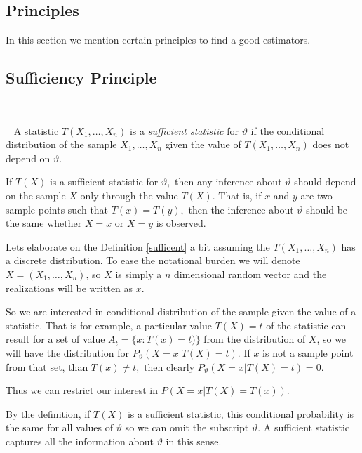 \documentclass[ 11pt,%
				a4paper,%
				twoside,%
				headinclude,%
				footinclude = true,%
				cleardoublepage = empty,%
				reqno]{scrbook}
\begin{document}
\subsection{Principles}


In this section we mention certain principles to find a good estimators. 

\subsection{Sufficiency Principle} %
~\label{sub:sufficiency}
\begin{definition}~\label{sufficent}
A statistic $T(X_1, \ldots, X_n)$ is a \emph{sufficient statistic} for $\vartheta$ if the conditional distribution of the sample $X_1, \ldots, X_n$ given the value of $T(X_1, \ldots, X_n)$ does not depend on $\vartheta$.
  
\end{definition}
\begin{lemma}
  If $T({X})$ is a sufficient statistic for $\vartheta,$ then any inference about $\vartheta$ should depend on the sample ${X}$ only through the value $T({X})$. That is, if ${x}$ and ${y}$ are two sample points such that $T({x})=T({y}),$ then the inference about $\vartheta$ should be the same whether ${X}={x}$ or ${X}={y}$ is observed.
\end{lemma}
Lets elaborate on the Definition \ref{sufficent} a bit assuming the $T(X_1, \ldots, X_n)$ has a discrete distribution. To ease the notational burden we will denote $X = (X_1, \ldots, X_n)$, so $X$ is simply a $n$ dimensional random vector and the realizations will be written as $x$. 


\begin{myfont}
So we are interested in conditional distribution of the sample given the value of a statistic. That is for example,  a particular value $T(X) = t$  of the statistic can result for a set of value $A_{t}=\{x: T(x)=t)\}$ from the distribution of $X$, so we will have the distribution for $P_{\vartheta}(X=x | T(X)=t)$. If $x$ is not a sample point from that set,  than $T(x) \neq t,$ then clearly $P_{\vartheta}(X=x | T(X)=t) =0$. 




Thus we can restrict our interest in $P(X=x | T(X)=T(x))$. \end{myfont} By the definition, if $T(X)$ is a sufficient statistic, this conditional probability is the same for all values of $\vartheta$ so we can omit the subscript $\vartheta$. A sufficient statistic captures all the information about $\vartheta$ in this sense. 
\end{document}

